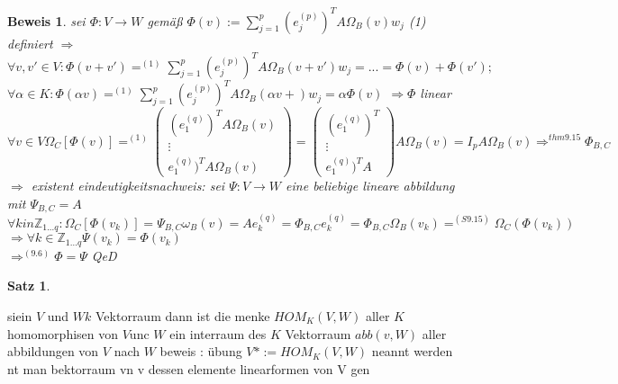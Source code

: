 \documentclass[11pt]{article}
\newtheorem{satz}{Satz}
\newtheorem{beweis}{Beweis}
\begin{document}
\begin{beweis}
 sei $\Phi: V \rightarrow W$ gemäß $\Phi(v):= \sum_{j=1}^p (e^{(p)}_j)^T A \Omega_B(v) w_j $ (1) definiert $\Rightarrow$ 
 $\forall v,v' \in V: \Phi(v +v')=^(1) \sum_{j=1}^p (e^{(p)}_j)^T A \Omega_B(v+v') w_j = ...= \Phi(v)+ \Phi(v');$
 $\forall \alpha \in K : \Phi (\alpha v) =^(1)  \sum_{j=1}^p (e^{(p)}_j)^T A \Omega_B(\alpha v+) w_j=\alpha \Phi (v)$
 $\Rightarrow \Phi $ linear
 $\forall v \in V \Omega_C[\Phi(v)]=^(1) 
 \begin{pmatrix}
 (e^{(q)}_1)^T A \Omega_B(v)\\
 \vdots\\
 e^{(q)}_1)^T A \Omega_B(v)
 \end{pmatrix}
 =
  \begin{pmatrix}
 (e^{(q)}_1)^T \\
 \vdots \\
 e^{(q)}_1)^T A 
 \end{pmatrix}
 A \Omega_B(v)
 = I_p A \Omega_B(v) \Rightarrow ^{thm 9.15} \mathbb{\Phi}_{B,C}$
$ \Rightarrow$ existent
 eindeutigkeitsnachweis:
 sei $\Psi: V\rightarrow W$ eine beliebige lineare abbildung mit $\mathbb{\Psi}_{B,C}=A$
 $ \forall k in \mathbb{Z}_{1...q}: \Omega_C[\Phi(v_k)]= \mathbb{\Psi}_{B,C}\omega_B(v)= A e_k^{(q)}
=\mathbb{\Phi}_{B,C}e_k^{(q)}=\mathbb{\Phi}_{B,C}\Omega_B(v_k)=^(S9.15) \Omega_C(\Phi(v_k))
$
$\Rightarrow \forall k \in \mathbb{Z}_{1...q} \Psi(v_k)=\Phi(v_k)$\\
$\Rightarrow^(9.6) \Phi=\Psi$
QeD
\end{beweis}
\begin{satz}
\end{satz}

 siein $V$ und $W k$ Vektorraum dann ist die menke $HOM_K (V,W)$ aller $K$ homomorphisen von $V $unc $W$ ein interraum des $K$ Vektorraum $abb(v,W)$ aller abbildungen von $V$ nach $W$
 beweis : übung
 $V* := HOM_K(V,W)$ neannt werden nt man bektorraum vn v dessen elemente linearformen von V gen
\end{document}
